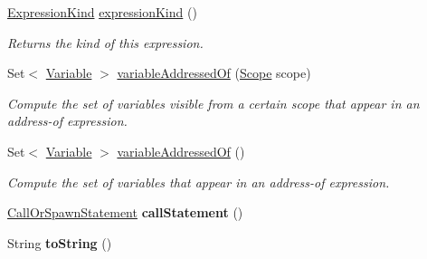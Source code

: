 \begin{DoxyCompactItemize}
\item 
\hyperlink{enumedu_1_1udel_1_1cis_1_1vsl_1_1civl_1_1model_1_1IF_1_1expression_1_1Expression_1_1ExpressionKind}{Expression\+Kind} \hyperlink{classedu_1_1udel_1_1cis_1_1vsl_1_1civl_1_1model_1_1common_1_1expression_1_1CommonSystemFunctionCallExpression_a20e97add3e09b59a4954dfb769b8366d}{expression\+Kind} ()
\begin{DoxyCompactList}\small\item\em Returns the kind of this expression. \end{DoxyCompactList}\item 
Set$<$ \hyperlink{interfaceedu_1_1udel_1_1cis_1_1vsl_1_1civl_1_1model_1_1IF_1_1variable_1_1Variable}{Variable} $>$ \hyperlink{classedu_1_1udel_1_1cis_1_1vsl_1_1civl_1_1model_1_1common_1_1expression_1_1CommonSystemFunctionCallExpression_ad4f396a5a07448836ebfac0b9fd76c69}{variable\+Addressed\+Of} (\hyperlink{interfaceedu_1_1udel_1_1cis_1_1vsl_1_1civl_1_1model_1_1IF_1_1Scope}{Scope} scope)
\begin{DoxyCompactList}\small\item\em Compute the set of variables visible from a certain scope that appear in an address-\/of expression. \end{DoxyCompactList}\item 
Set$<$ \hyperlink{interfaceedu_1_1udel_1_1cis_1_1vsl_1_1civl_1_1model_1_1IF_1_1variable_1_1Variable}{Variable} $>$ \hyperlink{classedu_1_1udel_1_1cis_1_1vsl_1_1civl_1_1model_1_1common_1_1expression_1_1CommonSystemFunctionCallExpression_a57a5d389d67df80b04feedd9eb50ded6}{variable\+Addressed\+Of} ()
\begin{DoxyCompactList}\small\item\em Compute the set of variables that appear in an address-\/of expression. \end{DoxyCompactList}\item 
\hypertarget{classedu_1_1udel_1_1cis_1_1vsl_1_1civl_1_1model_1_1common_1_1expression_1_1CommonSystemFunctionCallExpression_afd94767a8295af0446e7610517d602f9}{}\hyperlink{interfaceedu_1_1udel_1_1cis_1_1vsl_1_1civl_1_1model_1_1IF_1_1statement_1_1CallOrSpawnStatement}{Call\+Or\+Spawn\+Statement} {\bfseries call\+Statement} ()\label{classedu_1_1udel_1_1cis_1_1vsl_1_1civl_1_1model_1_1common_1_1expression_1_1CommonSystemFunctionCallExpression_afd94767a8295af0446e7610517d602f9}

\item 
\hypertarget{classedu_1_1udel_1_1cis_1_1vsl_1_1civl_1_1model_1_1common_1_1expression_1_1CommonSystemFunctionCallExpression_a65670cb6b7558c7179cbd73aca42b67f}{}String {\bfseries to\+String} ()\label{classedu_1_1udel_1_1cis_1_1vsl_1_1civl_1_1model_1_1common_1_1expression_1_1CommonSystemFunctionCallExpression_a65670cb6b7558c7179cbd73aca42b67f}


\end{DoxyCompactItemize}
